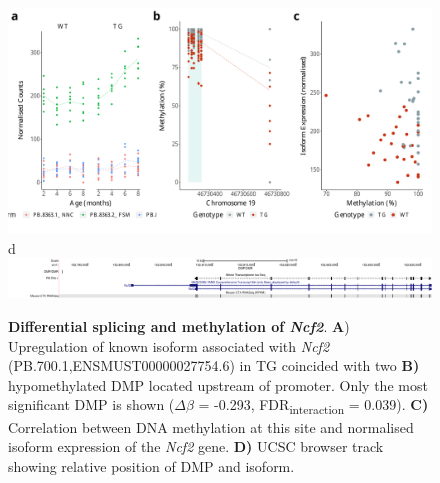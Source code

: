 \begin{figure}[h]
	\includegraphics[page=3,scale = 0.4]{Figures/WholeDifferentialAnalysis_DMPDMR.pdf}
	\\
	\hspace*{0.2cm}\vspace{0.5cm}\large d
	\\
	\includegraphics[page=1,trim={1.5cm 0 0 0},scale = 0.9]{Figures/NCF2_DMP.pdf}
	\captionsetup{width=0.95\textwidth}
	\caption[Differential splicing and methylation of \textit{Ncf2}]%
	{\textbf{Differential splicing and methylation of \textit{Ncf2}}. \textbf{A}) Upregulation of known isoform associated with \textit{Ncf2} (PB.700.1,ENSMUST00000027754.6) in TG coincided with two \textbf{B)} hypomethylated DMP located upstream of promoter. Only the most significant DMP is shown ($\Delta$$\beta$ = -0.293, FDR\textsubscript{interaction} = 0.039). \textbf{C)} Correlation between DNA methylation at this site and normalised isoform expression of the \textit{Ncf2} gene. \textbf{D)} UCSC browser track showing relative position of DMP and isoform.}    
	\label{fig:IntMeth_Ncf2}
\end{figure}

